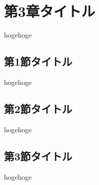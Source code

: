 \chapter{第3章タイトル}
hogehoge

  \section{第1節タイトル}
  hogehoge

  \section{第2節タイトル}
  hogehoge

  \section{第3節タイトル}
  hogehoge
